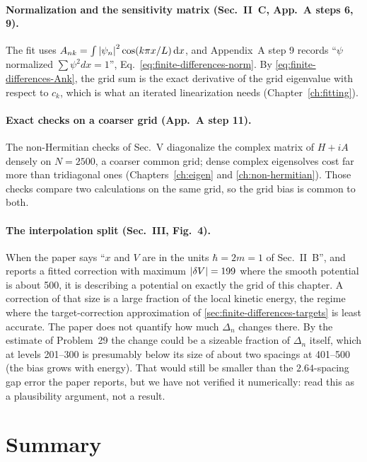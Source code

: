 \paragraph{Normalization and the sensitivity matrix (Sec.~II~C, App.~A steps 6, 9).} The fit uses $A_{nk}=\int\left\lvert \psi_n\right\rvert^2\cos(k\pi x/L)\,\mathrm{d} x$, and Appendix~A step 9 records ``$\psi$ normalized $\sum\psi^2dx=1$'', Eq.~\eqref{eq:finite-differences-norm}. By \eqref{eq:finite-differences-Ank}, the grid sum is the exact derivative of the grid eigenvalue with respect to $c_k$, which is what an iterated linearization needs (Chapter~\ref{ch:fitting}).

\paragraph{Exact checks on a coarser grid (App.~A step 11).} The non-Hermitian checks of Sec.~V diagonalize the complex matrix of $H+iA$ densely on $N=2500$, a coarser common grid; dense complex eigensolves cost far more than tridiagonal ones (Chapters~\ref{ch:eigen} and \ref{ch:non-hermitian}). Those checks compare two calculations on the same grid, so the grid bias is common to both.

\paragraph{The interpolation split (Sec.~III, Fig.~4).} When the paper says ``$x$ and $V$ are in the units $\hbar=2m=1$ of Sec.~II~B'', and reports a fitted correction with maximum $\left\lvert \delta V\right\rvert=199$ where the smooth potential is about 500, it is describing a potential on exactly the grid of this chapter. A correction of that size is a large fraction of the local kinetic energy, the regime where the target-correction approximation of \cref{sec:finite-differences-targets} is least accurate. The paper does not quantify how much $\Delta_n$ changes there. By the estimate of Problem~29 the change could be a sizeable fraction of $\Delta_n$ itself, which at levels 201--300 is presumably below its size of about two spacings at 401--500 (the bias grows with energy). That would still be smaller than the $2.64$-spacing gap error the paper reports, but we have not verified it numerically: read this as a plausibility argument, not a result.

\section{Summary}\label{sec:finite-differences-summary}

